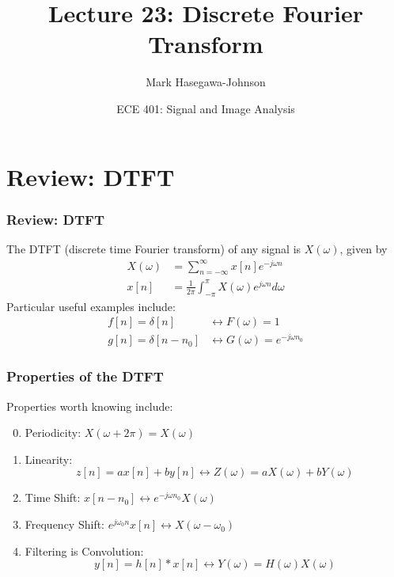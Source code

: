 \documentclass{beamer}
\title{Lecture 23: Discrete Fourier Transform}
\author{Mark Hasegawa-Johnson}
\date{ECE 401: Signal and Image Analysis}
\begin{document}
\begin{frame}
  \maketitle
\end{frame}

\begin{frame}
  \tableofcontents
\end{frame}

\section[DTFT]{Review: DTFT}
\setcounter{subsection}{1}

\begin{frame}
  \frametitle{Review: DTFT}

  The DTFT (discrete time Fourier transform) of any signal is
  $X(\omega)$, given by
  \begin{align*}
    X(\omega) &= \sum_{n=-\infty}^\infty x[n]e^{-j\omega n}\\
    x[n] &= \frac{1}{2\pi}\int_{-\pi}^\pi X(\omega)e^{j\omega n}d\omega
  \end{align*}
  Particular useful examples include:
  \begin{align*}
    f[n]=\delta[n] &\leftrightarrow F(\omega)=1\\
    g[n]=\delta[n-n_0] &\leftrightarrow G(\omega)=e^{-j\omega n_0}
  \end{align*}
\end{frame}

\begin{frame}
  \frametitle{Properties of the DTFT}

  Properties worth knowing  include:
  \begin{enumerate}
    \setcounter{enumi}{-1}
  \item Periodicity: $X(\omega+2\pi)=X(\omega)$
  \item Linearity:
    \[z[n]=ax[n]+by[n]\leftrightarrow Z(\omega)=aX(\omega)+bY(\omega)
    \]
  \item Time Shift: $x[n-n_0]\leftrightarrow e^{-j\omega n_0}X(\omega)$
  \item Frequency Shift: $e^{j\omega_0 n}x[n]\leftrightarrow X(\omega-\omega_0)$
  \item Filtering is Convolution:
    \[
    y[n]=h[n]\ast x[n]\leftrightarrow Y(\omega)=H(\omega)X(\omega)
    \]
  \end{enumerate}
\end{frame}
\end{document}
